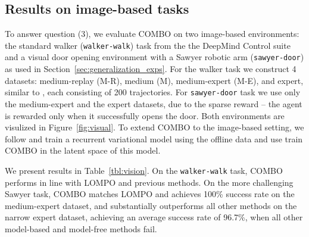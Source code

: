 \subsection{Results on image-based tasks}

To answer question (3), we evaluate COMBO on two image-based environments: the standard walker (\texttt{walker-walk}) task from the the DeepMind Control suite \cite{tassa2018deepmind} and a visual door opening environment with a Sawyer robotic arm (\texttt{sawyer-door}) as used in Section~\ref{sec:generalization_exps}. For the walker task we construct 4 datasets: medium-replay (M-R), medium (M), medium-expert (M-E), and expert, similar to \citet{fu2020d4rl}, each consisting of 200 trajectories. For \texttt{sawyer-door} task we use only the medium-expert and the expert datasets, due to the sparse reward -- the agent is rewarded only when it successfully opens the door. Both environments are visulized in Figure~\ref{fig:visual}. To extend COMBO to the image-based setting, we follow \citet{Rafailov2020LOMPO} and train a recurrent variational model using the offline data and use train COMBO in the latent space of this model.

We present results in Table~\ref{tbl:vision}. On the \texttt{walker-walk} task, COMBO performs in line with LOMPO and previous methods. On the more challenging Sawyer task, COMBO matches LOMPO and achieves 100\% success rate on the medium-expert dataset, and substantially outperforms all other methods on the narrow expert dataset, achieving an average success rate of 96.7\%, when all other model-based and model-free methods fail. 



